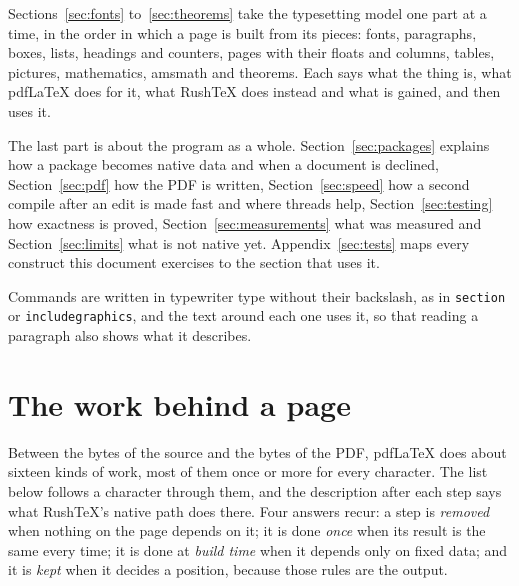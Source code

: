 \documentclass{article}
\numberwithin{equation}{section}
\theoremstyle{definition}
\theoremstyle{remark}
\begin{document}
Sections~\ref{sec:fonts} to~\ref{sec:theorems} take the typesetting model one part at a
time, in the order in which a page is built from its pieces: fonts, paragraphs, boxes,
lists, headings and counters, pages with their floats and columns, tables, pictures,
mathematics, amsmath and theorems. Each says what the thing is, what pdfLaTeX does for
it, what RushTeX does instead and what is gained, and then uses it.

The last part is about the program as a whole. Section~\ref{sec:packages} explains how a
package becomes native data and when a document is declined, Section~\ref{sec:pdf} how
the PDF is written, Section~\ref{sec:speed} how a second compile after an edit is made
fast and where threads help, Section~\ref{sec:testing} how exactness is proved,
Section~\ref{sec:measurements} what was measured and Section~\ref{sec:limits} what is
not native yet. Appendix~\ref{sec:tests} maps every construct this document exercises to
the section that uses it.

Commands are written in typewriter type without their backslash, as in
\texttt{section} or \texttt{includegraphics}, and the text around each one uses it, so
that reading a paragraph also shows what it describes.

\section{The work behind a page}\label{sec:work}

Between the bytes of the source and the bytes of the PDF, pdfLaTeX does about sixteen
kinds of work, most of them once or more for every character. The list below follows a
character through them, and the description after each step says what RushTeX's native
path does there. Four answers recur: a step is \emph{removed} when nothing on the page
depends on it; it is done \emph{once} when its result is the same every time; it is
done at \emph{build time} when it depends only on fixed data; and it is \emph{kept}
when it decides a position, because those rules are the output.
\end{document}
